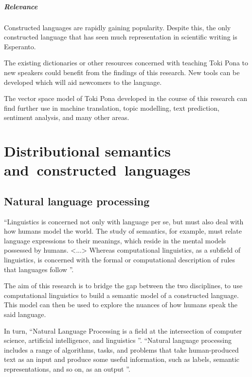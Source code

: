 \documentclass[14pt, a4paper]{extreport}
\begin{document}
\paragraph{Relevance}

Constructed languages are rapidly gaining popularity. Despite this, the only constructed language that has seen much representation in scientific writing is Esperanto.

The existing dictionaries or other resources concerned with teaching Toki Pona to new speakers could benefit from the findings of this research. New tools can be developed which will aid newcomers to the language.

The vector space model of Toki Pona developed in the course of this research can find further use in machine translation, topic modelling, text prediction, sentiment analysis, and many other areas.



\chapter{Distributional semantics and~constructed~languages}

\section{Natural language processing}
``Linguistics is concerned not only with language per se, but must also deal with how humans model the world. The study of semantics, for example, must relate language expressions to their meanings, which reside in the mental models possessed by humans. <...> Whereas computational linguistics, as a subfield of linguistics, is concerned with the formal or computational description of rules that languages follow \parencite{nlpandcl}''.

The aim of this research is to bridge the gap between the two disciplines, to use computational linguistics to build a semantic model of a constructed language. This model can then be used to explore the nuances of how humans speak the said language.

In turn, ``Natural Language Processing is a field at the intersection of computer science, artificial intelligence, and linguistics \parencite[7]{practicalnlp}''. ``Natural language processing includes a range of algorithms, tasks, and problems that take human-produced text as an input and produce some useful information, such as labels, semantic representations, and so on, as an output \parencite[4]{realworldnlp}''.
\end{document}
